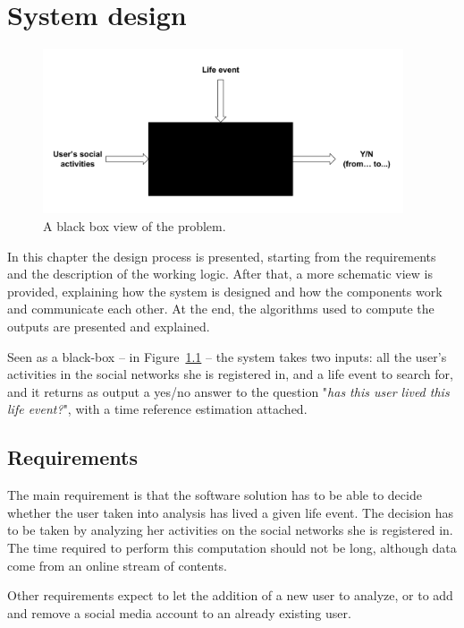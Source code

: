 \chapter{System design}
\label{cha:design}

\begin{figure}
\centering
\includegraphics[width=%
0.95\textwidth]{img/bb}
\caption{A black box view of the problem.}
\label{fig:bb}
\end{figure}

In this chapter the design process is presented, starting from the requirements and the description of the working logic. After that, a more schematic view is provided, explaining how the system is designed and how the components work and communicate each other. At the end, the algorithms used to compute the outputs are presented and explained.

Seen as a black-box -- in Figure~\ref{fig:bb} -- the system takes two inputs: all the user's activities in the social networks she is registered in, and a life event to search for, and it returns as output a yes/no answer to the question "\textit{has this user lived this life event?}", with a time reference estimation attached.

\section{Requirements}

The main requirement is that the software solution has to be able to decide whether the user taken into analysis has lived a given life event. The decision has to be taken by analyzing her activities on the social networks she is registered in. The time required to perform this computation should not be long, although data come from an online stream of contents.

Other requirements expect to let the addition of a new user to analyze, or to add and remove a social media account to an already existing user.

